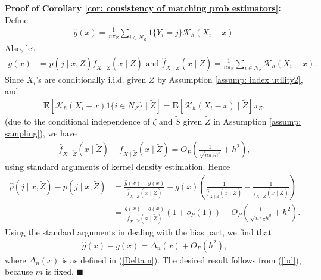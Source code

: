 \documentclass[12pt, fullpage]{amsart}
\theoremstyle{definition}
\theoremstyle{definition}
\theoremstyle{definition}
\begin{document}
\begin{bibunit}[econometrica]
\noindent \textbf{Proof of Corollary \ref{cor: consistency of matching prob estimators}: } Define
\begin{align*}
	\hat g(x) = \frac{1}{n \pi_Z} \sum_{i \in N_Z} 1\{Y_i = j\} \mathcal{K}_h\left( X_i - x \right).
\end{align*}
Also, let
\begin{align*}
     g(x) &= p(j \mid x,\tilde Z) f_{X \mid \tilde Z}(x \mid \tilde Z) \text{ and } \hat f_{X \mid \tilde Z} (x \mid \tilde Z) = \frac{1}{n \pi_Z} \sum_{i \in N_Z} \mathcal{K}_h\left( X_i - x \right).
\end{align*}
Since $X_i$'s are conditionally i.i.d. given $Z$ by Assumption \ref{assump: index utility2}, and 
\begin{align*}
	\mathbf{E}\left[ \mathcal{K}_h\left( X_i - x \right) 1\{i \in N_Z\} \mid \tilde Z \right] 
	= \mathbf{E}\left[ \mathcal{K}_h\left( X_i - x \right) \mid \tilde Z \right] \pi_Z,
\end{align*}
(due to the conditional independence of $\zeta$ and $\tilde S$ given $\tilde Z$ in Assumption \ref{assump: sampling}), we have
\begin{align*}
	\hat f_{X \mid \tilde Z} (x \mid \tilde Z) - f_{X \mid \tilde Z} (x \mid \tilde Z) = O_P\left( \frac{1}{\sqrt{n \pi_Z h^d}} + h^2\right),
\end{align*}
using standard arguments of kernel density estimation. Hence
\begin{align*}
	\hat p(j \mid x,\tilde Z) - p(j \mid x,\tilde Z) &= \frac{\hat g(x) - g(x)}{\hat f_{X \mid \tilde Z}( x \mid \tilde Z)} + g(x)\left( \frac{1}{\hat f_{X \mid \tilde Z}(x \mid \tilde Z)} - \frac{1}{f_{X \mid \tilde Z}(x \mid \tilde Z)} \right)\\
	   &= \frac{\hat g(x) - g(x)}{f_{X \mid \tilde Z}( x \mid \tilde Z)}\left( 1 + o_P(1) \right) + O_P\left( \frac{1}{\sqrt{n \pi_Z h^d}} + h^2\right).
\end{align*}
Using the standard arguments in dealing with the bias part, we find that
\begin{align*}
	\hat g(x) - g(x) = \Delta_n(x) + O_P(h^2),
\end{align*}
where $\Delta_n(x)$ is as defined in (\ref{Delta n}). The desired result follows from (\ref{bd}), because $m$ is fixed. $\blacksquare$ 

\putbib[LLN]
\end{bibunit}
\end{document}
